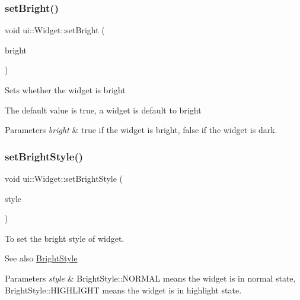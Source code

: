 \subsubsection{\texorpdfstring{set\+Bright()}{setBright()}\hspace{0.1cm}{\footnotesize\ttfamily [2/2]}}
{\footnotesize\ttfamily void ui\+::\+Widget\+::set\+Bright (\begin{DoxyParamCaption}\item[{bool}]{bright }\end{DoxyParamCaption})}

Sets whether the widget is bright

The default value is true, a widget is default to bright


\begin{DoxyParams}{Parameters}
{\em bright} & true if the widget is bright, false if the widget is dark. \\
\hline
\end{DoxyParams}
\mbox{\label{classui_1_1Widget_a9647a3476eaa459a0f70fb91710714f9}} 
\subsubsection{\texorpdfstring{set\+Bright\+Style()}{setBrightStyle()}\hspace{0.1cm}{\footnotesize\ttfamily [1/2]}}
{\footnotesize\ttfamily void ui\+::\+Widget\+::set\+Bright\+Style (\begin{DoxyParamCaption}\item[{\hyperlink{classui_1_1Widget_a4040e89d49e005b771ac8a80a13206fc}{Bright\+Style}}]{style }\end{DoxyParamCaption})}

To set the bright style of widget.

\begin{DoxySeeAlso}{See also}
\hyperlink{classui_1_1Widget_a4040e89d49e005b771ac8a80a13206fc}{Bright\+Style}
\end{DoxySeeAlso}

\begin{DoxyParams}{Parameters}
{\em style} & Bright\+Style\+::\+N\+O\+R\+M\+AL means the widget is in normal state, Bright\+Style\+::\+H\+I\+G\+H\+L\+I\+G\+HT means the widget is in highlight state. \\
\hline
\end{DoxyParams}
\mbox{\label{classui_1_1Widget_a9647a3476eaa459a0f70fb91710714f9}} 
